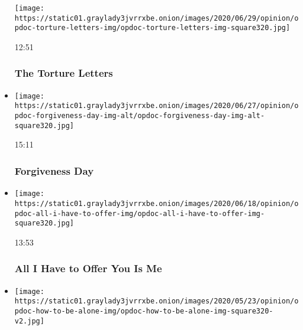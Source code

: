 \begin{itemize}
  \texttt{[image: https://static01.graylady3jvrrxbe.onion/images/2020/06/29/opinion/opdoc-torture-letters-img/opdoc-torture-letters-img-square320.jpg]}

  12:51

  \hypertarget{the-torture-letters}{%
  \subsubsection{The Torture Letters}\label{the-torture-letters}}
\item
  \href{https://www.nytimes3xbfgragh.onion/video/opinion/100000007172575/forgiveness-day.html?action=click\&module=video-series-bar\&region=header\&pgtype=Article\&playlistId=video/op-docs}{}

  \texttt{[image: https://static01.graylady3jvrrxbe.onion/images/2020/06/27/opinion/opdoc-forgiveness-day-img-alt/opdoc-forgiveness-day-img-alt-square320.jpg]}

  15:11

  \hypertarget{forgiveness-day}{%
  \subsubsection{Forgiveness Day}\label{forgiveness-day}}
\item
  \href{https://www.nytimes3xbfgragh.onion/video/opinion/100000007133685/all-i-have-to-offer-you-is-me.html?action=click\&module=video-series-bar\&region=header\&pgtype=Article\&playlistId=video/op-docs}{}

  \texttt{[image: https://static01.graylady3jvrrxbe.onion/images/2020/06/18/opinion/opdoc-all-i-have-to-offer-img/opdoc-all-i-have-to-offer-img-square320.jpg]}

  13:53

  \hypertarget{all-i-have-to-offer-you-is-me}{%
  \subsubsection{All I Have to Offer You Is
  Me}\label{all-i-have-to-offer-you-is-me}}
\item
  \href{https://www.nytimes3xbfgragh.onion/video/opinion/100000007139379/how-to-be-alone.html?action=click\&module=video-series-bar\&region=header\&pgtype=Article\&playlistId=video/op-docs}{}

  \texttt{[image: https://static01.graylady3jvrrxbe.onion/images/2020/05/23/opinion/opdoc-how-to-be-alone-img/opdoc-how-to-be-alone-img-square320-v2.jpg]}


\end{itemize}
